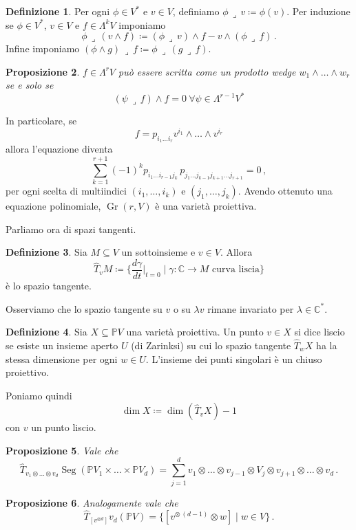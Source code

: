 \documentclass[a4paper, 11pt]{article}
\theoremstyle{definition}
\newtheorem{Def}{Definizione}[section]
\theoremstyle{plain}
\newtheorem{Prop}[Def]{Proposizione}
\newcommand{\PP}{\mathbb{P}}
\newcommand{\C}{\mathbb{C}}
\newcommand{\deff}{\coloneqq}
\DeclareMathOperator{\Gr}{Gr}
\DeclareMathOperator{\Seg}{Seg}
\begin{document}
\begin{Def}
	Per ogni $\phi \in V^\ast$ e $v \in V$, definiamo $\phi \,\lrcorner \,v \deff \phi(v)$. Per induzione se $\phi \in V^\ast$, $v \in V$ e $f \in \Lambda^k V$ imponiamo
	\[
		\phi\,\lrcorner\,(v \wedge f) \deff (\phi \,\lrcorner\, v) \wedge f - v \wedge (\phi \,\lrcorner\, f)\,.
	\]
	Infine imponiamo $(\phi \wedge g)\,\lrcorner\, f \deff \phi\,\lrcorner\,(g\, \lrcorner\, f)$.
\end{Def}
\begin{Prop}
	$f \in \Lambda^r V$ può essere scritta come un prodotto wedge $w_1 \wedge\dots\wedge w_r$ se e solo se 
	\[
		(\psi \,\lrcorner\,f) \wedge f = 0\ \forall \psi \in \Lambda^{r-1}V^*
	\]
\end{Prop}
In particolare, se 
\[
	f = p_{i_1\dots i_r}v^{i_1} \wedge \dots \wedge v^{i_r}
\] 
allora l'equazione diventa
\[
	\sum_{k=1}^{r+1}(-1)^kp_{i_1\dots i_{r-1}j_k}\,p_{j_1\dots j_{k-1}j_{k+1}\dots j_{r+1}} = 0\,,
\]
per ogni scelta di multiindici $(i_1, \dots, i_k)$ e $(j_1, \dots, j_k)$. Avendo ottenuto una equazione polinomiale, $\Gr(r,V)$ è una varietà proiettiva.

Parliamo ora di spazi tangenti. 
\begin{Def}
	Sia $M \subseteq V$ un sottoinsieme e $v \in V$. Allora
	\[
		\hat{T}_vM \deff \Big\{\frac{d\gamma}{dt}\Big|_{t = 0} \mid \gamma \colon \C \to M \text{ curva liscia}\Big\}
	\]
	è lo spazio tangente.
\end{Def}
Osserviamo che lo spazio tangente su $v$ o su $\lambda v$ rimane invariato per $\lambda \in \C^*$.

\begin{Def}
	Sia $X \subseteq \PP V$ una varietà proiettiva. Un punto $v \in X$ si dice liscio se esiste un insieme aperto $U$ (di Zarinksi) su cui lo spazio tangente $\hat{T}_w X$ ha la stessa dimensione per ogni $w \in U$. L'insieme dei punti singolari è un chiuso proiettivo.
\end{Def}

Poniamo quindi 
\[
	\dim X \deff \dim (\hat{T}_v X)-1
\]
con $v$ un punto liscio.

\begin{Prop}
	Vale che
	\[
		\hat{T}_{v_1\otimes \dots \otimes v_d} \Seg(\PP V_1 \times \dots \times \PP V_d) = \sum_{j =1}^d
 v_1 \otimes \dots \otimes v_{j-1}\otimes V_j\otimes v_{j+1} \otimes \dots \otimes v_d\,.
 	\]
\end{Prop}
\begin{Prop}
	Analogamente vale che
	\[
		\hat{T}_{[v^{\otimes d}]} v_d(\PP V) = \{[v^{\otimes\, (d-1)}\otimes w] \mid w \in V\}\,.
	\]
\end{Prop}
\printbibliography
\end{document}
